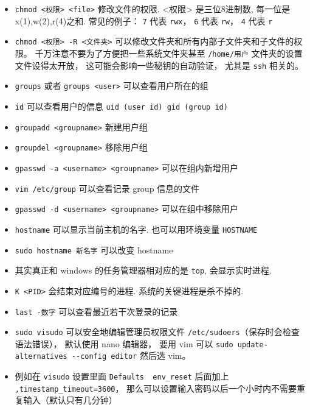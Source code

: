 \begin{itemize}
\item \verb`chmod <权限> <file>` 修改文件的权限. <权限> 是三位8进制数, 每一位是 x(1),w(2),r(4)之和. 常见的例子： \verb|7| 代表 \verb|rwx|， \verb|6| 代表 \verb|rw|， \verb|4| 代表 \verb|r|
\item \verb`chmod <权限> -R <文件夹>` 可以修改文件夹和所有内部子文件夹和子文件的权限。 千万注意不要为了方便把一些系统文件夹甚至 \verb|/home/用户| 文件夹的设置文件设得太开放， 这可能会影响一些秘钥的自动验证， 尤其是 \verb|ssh| 相关的。
\item \verb`groups` 或者 \verb`groups <user>` 可以查看用户所在的组
\item \verb`id` 可以查看用户的信息 \verb`uid (user id) gid (group id)`
\item \verb`groupadd <groupname>` 新建用户组
\item \verb`groupdel <groupname>` 移除用户组
\item \verb`gpasswd -a <username> <groupname>` 可以在组内新增用户
\item \verb`vim /etc/group` 可以查看记录 group 信息的文件
\item \verb`gpasswd -d <username> <groupname>` 可以在组中移除用户
\item \verb`hostname` 可以显示当前主机的名字. 也可以用环境变量 \verb|HOSTNAME|
\item \verb|sudo hostname 新名字| 可以改变 hostname
\item 其实真正和 windows 的任务管理器相对应的是 \verb`top`, 会显示实时进程. 
\item \verb`K <PID>` 会结束对应编号的进程. 系统的关键进程是杀不掉的.
\item \verb`last -数字` 可以查看最近若干次登录的记录
\item \verb|sudo visudo| 可以安全地编辑管理员权限文件 \verb|/etc/sudoers|（保存时会检查语法错误）， 默认使用 nano 编辑器， 要用 vim
 可以 \verb|sudo update-alternatives --config editor| 然后选 vim。
\item 例如在 \verb|visudo| 设置里面 \verb|Defaults  env_reset| 后面加上 \verb|,timestamp_timeout=3600|， 那么可以设置输入密码以后一个小时内不需要重复输入（默认只有几分钟）
\end{itemize}

